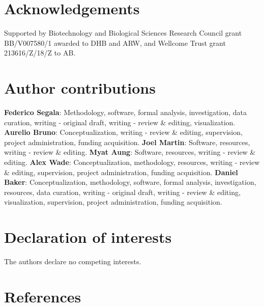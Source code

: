 \documentclass[
]{article}
\begin{document}
\hypertarget{acknowledgements}{%
\section{Acknowledgements}\label{acknowledgements}}

Supported by Biotechnology and Biological Sciences Research Council grant BB/V007580/1 awarded to DHB and ARW, and Wellcome Trust grant 213616/Z/18/Z to AB.

\hypertarget{author-contributions}{%
\section{Author contributions}\label{author-contributions}}

\textbf{Federico Segala}: Methodology, software, formal analysis, investigation, data curation, writing - original draft, writing - review \& editing, visualization. \textbf{Aurelio Bruno}: Conceptualization, writing - review \& editing, supervision, project administration, funding acquisition. \textbf{Joel Martin}: Software, resources, writing - review \& editing. \textbf{Myat Aung}: Software, resources, writing - review \& editing. \textbf{Alex Wade}: Conceptualization, methodology, resources, writing - review \& editing, supervision, project administration, funding acquisition. \textbf{Daniel Baker}: Conceptualization, methodology, software, formal analysis, investigation, resources, data curation, writing - original draft, writing - review \& editing, visualization, supervision, project administration, funding acquisition.

\hypertarget{declaration-of-interests}{%
\section{Declaration of interests}\label{declaration-of-interests}}

The authors declare no competing interests.

\hypertarget{references}{%
\section{References}\label{references}}
\end{document}
